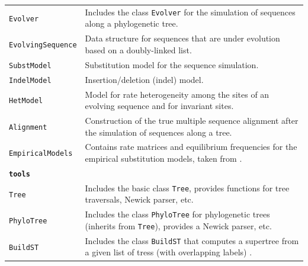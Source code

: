 \documentclass[hidelinks,11pt]{article}
\begin{document}
{\begin{longtable}{| p{4.0cm} | p{10cm} |}
	\texttt{Evolver} &
	Includes the class \texttt{Evolver} for the simulation of sequences along a phylogenetic tree. \\
	\texttt{EvolvingSequence} &
	Data structure for sequences that are under evolution based on a doubly-linked list. \\
	\texttt{SubstModel} &
	Substitution model for the sequence simulation. \\
	\texttt{IndelModel} &
	Insertion/deletion (indel) model. \\
	\texttt{HetModel} &
	Model for rate heterogeneity among the sites of an evolving sequence and for invariant sites. \\
	\texttt{Alignment} &
	Construction of the true multiple sequence alignment after the simulation of sequences along a tree. \\
	\texttt{EmpiricalModels} &
	Contains rate matrices and equilibrium frequencies for the empirical substitution models, taken from \citep{criscuolo}. \\
	\hline
	\multicolumn{2}{|l|}{\textbf{\texttt{tools}}}\\
	\hline
	\texttt{Tree} &
	Includes the basic class \texttt{Tree}, provides functions for tree traversals, Newick parser, etc. \\
	\texttt{PhyloTree} &
	Includes the class \texttt{PhyloTree} for phylogenetic trees (inherits from \texttt{Tree}), provides a Newick parser, etc. \\
	\texttt{BuildST} &
	Includes the class \texttt{BuildST} that computes a supertree from a given list of tress (with overlapping labels) \citep{deng2016}. \\

\end{longtable}}
\end{document}
